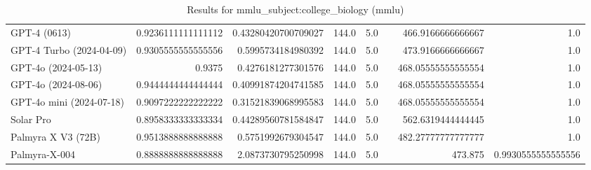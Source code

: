 \begin{table}[htp]
{\begin{tabular}{lrrrrrrr}
GPT-4 (0613) & 0.9236111111111112 & 0.43280420700709027 & 144.0 & 5.0 &  & 466.9166666666667 & 1.0 \\
GPT-4 Turbo (2024-04-09) & 0.9305555555555556 & 0.5995734184980392 & 144.0 & 5.0 &  & 473.9166666666667 & 1.0 \\
GPT-4o (2024-05-13) & 0.9375 & 0.4276181277301576 & 144.0 & 5.0 &  & 468.05555555555554 & 1.0 \\
GPT-4o (2024-08-06) & 0.9444444444444444 & 0.40991874204741585 & 144.0 & 5.0 &  & 468.05555555555554 & 1.0 \\
GPT-4o mini (2024-07-18) & 0.9097222222222222 & 0.31521839068995583 & 144.0 & 5.0 &  & 468.05555555555554 & 1.0 \\
Solar Pro & 0.8958333333333334 & 0.44289560781584847 & 144.0 & 5.0 &  & 562.6319444444445 & 1.0 \\
Palmyra X V3 (72B) & 0.9513888888888888 & 0.5751992679304547 & 144.0 & 5.0 &  & 482.27777777777777 & 1.0 \\
Palmyra-X-004 & 0.8888888888888888 & 2.0873730795250998 & 144.0 & 5.0 &  & 473.875 & 0.9930555555555556 \\
\bottomrule
\end{tabular}}
\caption{Results for mmlu_subject:college_biology (mmlu)}
\label{fig:mmlu_subject:college_biology (mmlu)}
\end{table}